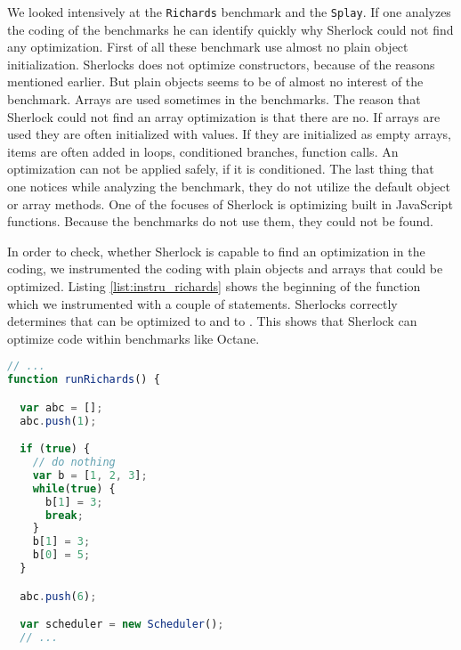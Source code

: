 We looked intensively at the \texttt{Richards} benchmark and the \texttt{Splay}. If one analyzes the coding of the benchmarks he can identify quickly why Sherlock could not find any optimization. First of all these benchmark use almost no plain object initialization. Sherlocks does not optimize constructors, because of the reasons mentioned earlier. But plain objects seems to be of almost no interest of the benchmark.
Arrays are used sometimes in the benchmarks. The reason that Sherlock could not find an array optimization is that there are no. If arrays are used they are often initialized with values. If they are initialized as empty arrays, items are often added in loops, conditioned branches, function calls. An optimization can not be applied safely, if it is conditioned. The last thing that one notices while analyzing the benchmark, they do not utilize the default object or array methods. One of the focuses of Sherlock is optimizing built in JavaScript functions. Because the benchmarks do not use them, they could not be found.

In order to check, whether Sherlock is capable to find an optimization in the coding, we instrumented the coding with plain objects and arrays that could be optimized. Listing \ref{list:instru_richards} shows the beginning of the function  which we instrumented with a couple of statements. Sherlocks correctly determines that  can be optimized to \js{[1, 6]} and  to \js{[5, 2, 3]}. This shows that Sherlock can optimize code within benchmarks like Octane.

\begin{lstlisting}[caption=Richards,label=list:instru_richards,language=Javascript]
// ...
function runRichards() {

  var abc = [];
  abc.push(1);

  if (true) {
    // do nothing
    var b = [1, 2, 3];
    while(true) {
      b[1] = 3;
      break;
    }
    b[1] = 3;
    b[0] = 5;
  }

  abc.push(6);

  var scheduler = new Scheduler();
  // ...
\end{lstlisting}

